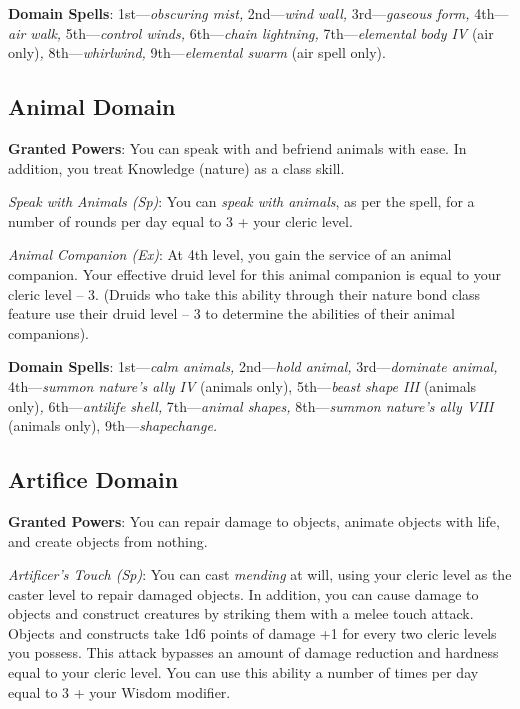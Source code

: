 \textbf{Domain Spells}: 1st---\textit{obscuring mist, }2nd---\textit{wind wall, }3rd---\textit{gaseous form, }4th---\textit{air walk, }5th---\textit{control winds, }6th---\textit{chain lightning, }7th---\textit{elemental body IV} (air only)\textit{, }8th---\textit{whirlwind, }9th---\textit{elemental swarm} (air spell only).

\subsection{Animal Domain}

\textbf{Granted Powers}: You can speak with and befriend animals with ease. In addition, you treat Knowledge
(nature) as a class skill.

\textit{Speak with Animals (Sp)}: You can \textit{speak with animals}, as per the spell, for a number of rounds
    per day equal to 3 + your cleric level. 
				
\textit{Animal Companion (Ex)}: At 4th level, you gain the service of an animal companion. Your effective druid
    level for this animal companion is equal to your cleric level -- 3. (Druids who take this ability through their
    nature bond class feature use their druid level -- 3 to determine the abilities of their animal companions).
				
\textbf{Domain Spells}: 1st---\textit{calm animals, }2nd---\textit{hold animal, }3rd---\textit{dominate animal, }4th---\textit{summon nature's ally IV} (animals only), 5th---\textit{beast shape III }(animals only)\textit{, }6th---\textit{antilife shell, }7th---\textit{animal shapes, }8th---\textit{summon nature's ally VIII }(animals only), 9th---\textit{shapechange.}
				
\subsection{Artifice Domain}

				
\textbf{Granted Powers}: You can repair damage to objects, animate objects with life, and create objects from nothing.
				
\textit{Artificer's Touch (Sp)}: You can cast \textit{mending }at will, using your cleric level as the caster level to repair damaged objects. In addition, you can cause damage to objects and construct creatures by striking them with a melee touch attack. Objects and constructs take 1d6 points of damage +1 for every two cleric levels you possess. This attack bypasses an amount of damage reduction and hardness equal to your cleric level. You can use this ability a number of times per day equal to 3 + your Wisdom modifier.
				
